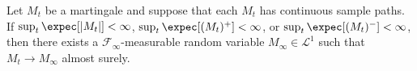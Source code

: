 		\begin{theorem}
			Let $M_t$ be a martingale and suppose that each $M_t$ has continuous sample paths. If $\sup_t\expec[|M_t|]<\infty$, $\sup_t\expec[(M_t)^+]<\infty$, or $\sup_t \expec[(M_t)^-]<\infty$, then there exists a $\mathcal{F}_\infty$-measurable random variable $M_\infty\in\mathcal{L}^1$ such that $M_t\to M_\infty$ almost surely.
		\end{theorem}